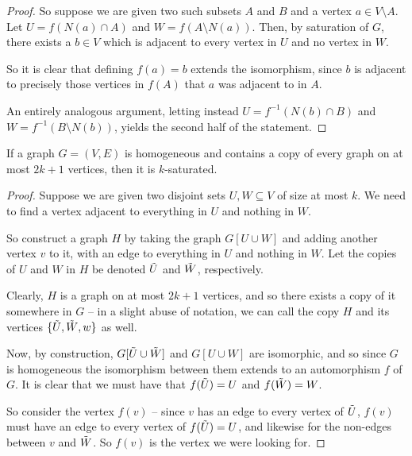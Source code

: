 \documentclass[nobib]{tufte-handout}
\begin{document}
\begin{lemma}
\begin{proof}
        So suppose we are given two such subsets $A$ and $B$ and a vertex $a \in V \setminus A$. Let $U = f\left(N(a) \cap A\right)$ and $W = f\left(A \setminus N(a)\right)$. Then, by saturation of $G$, there exists a $b \in V$ which is adjacent to every vertex in $U$ and no vertex in $W$.

        So it is clear that defining $f(a) = b$ extends the isomorphism, since $b$ is adjacent to precisely those vertices in $f(A)$ that $a$ was adjacent to in $A$.

        An entirely analogous argument, letting instead $U = f^{-1}\left(N(b) \cap B\right)$ and $W = f^{-1}\left(B \setminus N(b)\right)$, yields the second half of the statement.
    \end{proof}
\end{lemma}

\begin{lemma}
    If a graph $G = (V,E)$ is homogeneous and contains a copy of every graph on at most $2k + 1$ vertices, then it is $k$-saturated.

    \begin{proof}
        Suppose we are given two disjoint sets $U, W \subseteq V$ of size at most $k$. We need to find a vertex adjacent to everything in $U$ and nothing in $W$.

        So construct a graph $H$ by taking the graph $G[U \cup W]$ and adding another vertex $v$ to it, with an edge to everything in $U$ and nothing in $W$. Let the copies of $U$ and $W$ in $H$ be denoted $\Tilde U$ and $\Tilde W$, respectively.
        
        Clearly, $H$ is a graph on at most $2k + 1$ vertices, and so there exists a copy of it somewhere in $G$ -- in a slight abuse of notation, we can call the copy $H$ and its vertices $\{\Tilde U, \Tilde W, w\}$ as well.

        Now, by construction, $G[\Tilde U \cup \Tilde W]$ and $G[U \cup W]$ are isomorphic, and so since $G$ is homogeneous the isomorphism between them extends to an automorphism $f$ of $G$. It is clear that we must have that $f(\Tilde U) = U$ and $f(\Tilde W) = W$.

        So consider the vertex $f(v)$ -- since $v$ has an edge to every vertex of $\Tilde U$, $f(v)$ must have an edge to every vertex of $f(\Tilde U) = U$, and likewise for the non-edges between $v$ and $\Tilde W$. So $f(v)$ is the vertex we were looking for. 
    \end{proof}
\end{lemma}
\end{document}
